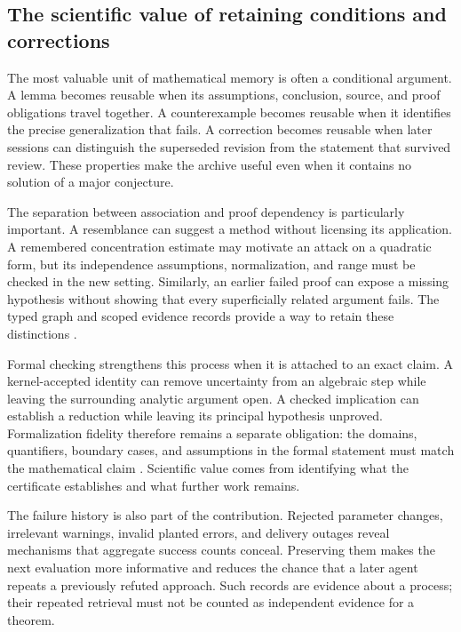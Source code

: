 \subsection{The scientific value of retaining conditions and corrections}

The most valuable unit of mathematical memory is often a conditional argument. A lemma becomes reusable when its assumptions, conclusion, source, and proof obligations travel together. A counterexample becomes reusable when it identifies the precise generalization that fails. A correction becomes reusable when later sessions can distinguish the superseded revision from the statement that survived review. These properties make the archive useful even when it contains no solution of a major conjecture.

The separation between association and proof dependency is particularly important. A resemblance can suggest a method without licensing its application. A remembered concentration estimate may motivate an attack on a quadratic form, but its independence assumptions, normalization, and range must be checked in the new setting. Similarly, an earlier failed proof can expose a missing hypothesis without showing that every superficially related argument fails. The typed graph and scoped evidence records provide a way to retain these distinctions \citep{matharchitecture,mathretrieval,mistakes}.

Formal checking strengthens this process when it is attached to an exact claim. A kernel-accepted identity can remove uncertainty from an algebraic step while leaving the surrounding analytic argument open. A checked implication can establish a reduction while leaving its principal hypothesis unproved. Formalization fidelity therefore remains a separate obligation: the domains, quantifiers, boundary cases, and assumptions in the formal statement must match the mathematical claim \citep{leanimplementation,leanbroad,leanparser}. Scientific value comes from identifying what the certificate establishes and what further work remains.

The failure history is also part of the contribution. Rejected parameter changes, irrelevant warnings, invalid planted errors, and delivery outages reveal mechanisms that aggregate success counts conceal. Preserving them makes the next evaluation more informative and reduces the chance that a later agent repeats a previously refuted approach. Such records are evidence about a process; their repeated retrieval must not be counted as independent evidence for a theorem.

